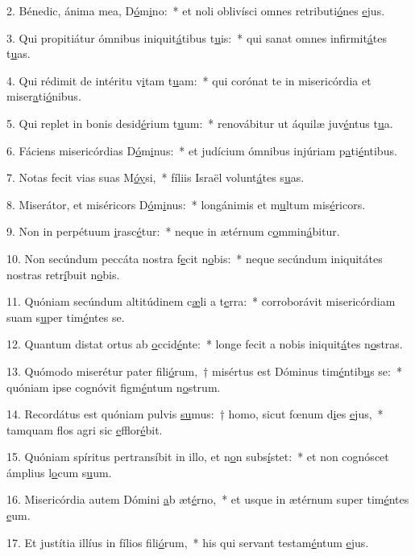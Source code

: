 2. Bénedic, ánima mea, D\uline{ó}m\uline{i}no:~* et noli oblivísci omnes retributi\uline{ó}nes \uline{e}jus.\par 
3. Qui propitiátur ómnibus iniquit\uline{á}tibus t\uline{u}is:~* qui sanat omnes infirmit\uline{á}tes t\uline{u}as.\par 
4. Qui rédimit de intéritu v\uline{i}tam t\uline{u}am:~* qui corónat te in misericórdia et miser\uline{a}ti\uline{ó}nibus.\par 
5. Qui replet in bonis desid\uline{é}rium t\uline{u}um:~* renovábitur ut áquilæ juv\uline{é}ntus t\uline{u}a.\par 
6. Fáciens misericórdias D\uline{ó}m\uline{i}nus:~* et judícium ómnibus injúriam p\uline{a}ti\uline{é}ntibus.\par 
7. Notas fecit vias suas M\uline{ó}\uline{y}si,~* fíliis Israël volunt\uline{á}tes s\uline{u}as.\par 
8. Miserátor, et miséricors D\uline{ó}m\uline{i}nus:~* longánimis et m\uline{u}ltum mis\uline{é}ricors.\par 
9. Non in perpétuum \uline{i}rasc\uline{é}tur:~* neque in ætérnum c\uline{o}mmin\uline{á}bitur.\par 
10. Non secúndum peccáta nostra f\uline{e}cit n\uline{o}bis:~* neque secúndum iniquitátes nostras retr\uline{í}buit n\uline{o}bis.\par 
11. Quóniam secúndum altitúdinem c\uline{æ}li a t\uline{e}rra:~* corroborávit misericórdiam suam s\uline{u}per tim\uline{é}ntes se.\par 
12. Quantum distat ortus ab \uline{o}ccid\uline{é}nte:~* longe fecit a nobis iniquit\uline{á}tes n\uline{o}stras.\par 
13. Quómodo miserétur pater fili\uline{ó}rum,~† misértus est Dóminus tim\uline{é}ntib\uline{u}s se:~* quóniam ipse cognóvit figm\uline{é}ntum n\uline{o}strum.\par 
14. Recordátus est quóniam pulvis \uline{su}mus:~† homo, sicut fœnum d\uline{i}es \uline{e}jus,~* tamquam flos agri sic \uline{e}fflor\uline{é}bit.\par 
15. Quóniam spíritus pertransíbit in illo, et n\uline{o}n subs\uline{í}stet:~* et non cognóscet ámplius l\uline{o}cum s\uline{u}um.\par 
16. Misericórdia autem Dómini \uline{a}b æt\uline{é}rno,~* et usque in ætérnum super tim\uline{é}ntes \uline{e}um.\par 
17. Et justítia illíus in fílios f\uline{i}li\uline{ó}rum,~* his qui servant testam\uline{é}ntum \uline{e}jus.\par 
